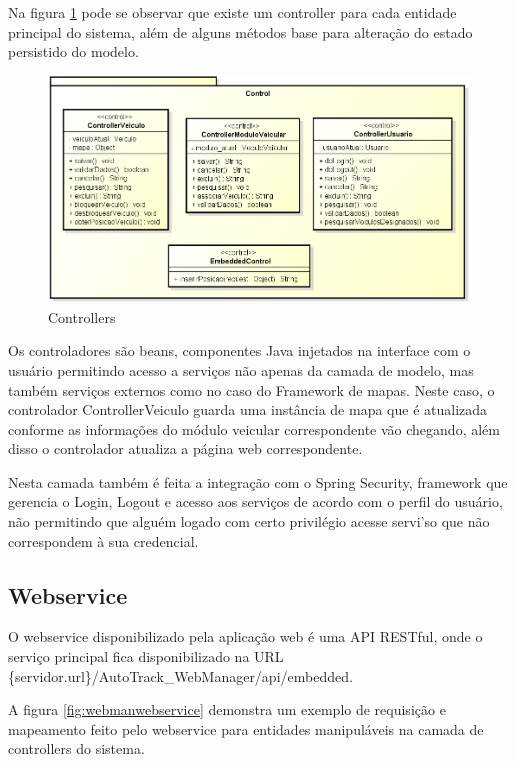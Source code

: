 Na figura \ref{fig:webmancontrol} pode se observar que existe um controller para cada entidade principal do sistema, além de alguns métodos base para alteração do estado persistido do modelo.

\begin{figure}[!htb]
	\centering
	\includegraphics[width=\textwidth]{figures/webm_control.png}
	\caption{Controllers}
	\label{fig:webmancontrol}
\end{figure}

Os controladores são beans, componentes Java injetados na interface com o usuário permitindo acesso a serviços não apenas da camada de modelo, mas também serviços externos como no caso do Framework de mapas. Neste caso, o controlador ControllerVeiculo guarda uma instância de mapa que é atualizada conforme as informações do módulo veicular correspondente vão chegando, além disso o controlador atualiza a página web correspondente.

Nesta camada também é feita a integração com o Spring Security, framework que gerencia o Login, Logout e acesso aos serviços de acordo com o perfil do usuário, não permitindo que alguém logado com certo privilégio acesse servi'so que não correspondem à sua credencial.

\newpage

\subsection {Webservice}

O webservice disponibilizado pela aplicação web é uma API RESTful, onde o serviço principal fica disponibilizado na URL \{servidor.url\}/AutoTrack\_WebManager/api/embedded. 

A figura \ref{fig:webmanwebservice} demonstra um exemplo de requisição e mapeamento feito pelo webservice para entidades manipuláveis na camada de controllers do sistema.

